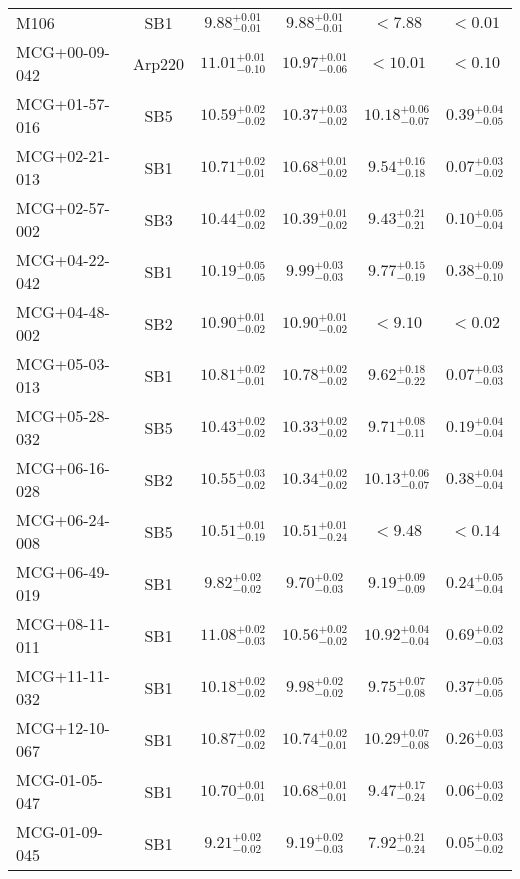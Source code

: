 \documentclass[onecolumn]{mn2e}
\begin{document}
{\begin{center}
\begin{longtable}{lccccc}
M106 & SB1 & $9.88_{-0.01}^{+0.01}$ & $9.88_{-0.01}^{+0.01}$ & $<7.88$ &$<0.01$ \\
MCG+00-09-042 & Arp220 & $11.01_{-0.10}^{+0.01}$ & $10.97_{-0.06}^{+0.01}$ & $<10.01$ &$<0.10$ \\
MCG+01-57-016 & SB5 & $10.59_{-0.02}^{+0.02}$ & $10.37_{-0.02}^{+0.03}$ & $10.18_{-0.07}^{+0.06}$ &$0.39_{-0.05}^{+0.04}$ \\
MCG+02-21-013 & SB1 & $10.71_{-0.01}^{+0.02}$ & $10.68_{-0.02}^{+0.01}$ & $9.54_{-0.18}^{+0.16}$ &$0.07_{-0.02}^{+0.03}$ \\
MCG+02-57-002 & SB3 & $10.44_{-0.02}^{+0.02}$ & $10.39_{-0.02}^{+0.01}$ & $9.43_{-0.21}^{+0.21}$ &$0.10_{-0.04}^{+0.05}$ \\
MCG+04-22-042 & SB1 & $10.19_{-0.05}^{+0.05}$ & $9.99_{-0.03}^{+0.03}$ & $9.77_{-0.19}^{+0.15}$ &$0.38_{-0.10}^{+0.09}$ \\
MCG+04-48-002 & SB2 & $10.90_{-0.02}^{+0.01}$ & $10.90_{-0.02}^{+0.01}$ & $<9.10$ &$<0.02$ \\
MCG+05-03-013 & SB1 & $10.81_{-0.01}^{+0.02}$ & $10.78_{-0.02}^{+0.02}$ & $9.62_{-0.22}^{+0.18}$ &$0.07_{-0.03}^{+0.03}$ \\
MCG+05-28-032 & SB5 & $10.43_{-0.02}^{+0.02}$ & $10.33_{-0.02}^{+0.02}$ & $9.71_{-0.11}^{+0.08}$ &$0.19_{-0.04}^{+0.04}$ \\
MCG+06-16-028 & SB2 & $10.55_{-0.02}^{+0.03}$ & $10.34_{-0.02}^{+0.02}$ & $10.13_{-0.07}^{+0.06}$ &$0.38_{-0.04}^{+0.04}$ \\
MCG+06-24-008 & SB5 & $10.51_{-0.19}^{+0.01}$ & $10.51_{-0.24}^{+0.01}$ & $<9.48$ &$<0.14$ \\
MCG+06-49-019 & SB1 & $9.82_{-0.02}^{+0.02}$ & $9.70_{-0.03}^{+0.02}$ & $9.19_{-0.09}^{+0.09}$ &$0.24_{-0.04}^{+0.05}$ \\
MCG+08-11-011 & SB1 & $11.08_{-0.03}^{+0.02}$ & $10.56_{-0.02}^{+0.02}$ & $10.92_{-0.04}^{+0.04}$ &$0.69_{-0.03}^{+0.02}$ \\
MCG+11-11-032 & SB1 & $10.18_{-0.02}^{+0.02}$ & $9.98_{-0.02}^{+0.02}$ & $9.75_{-0.08}^{+0.07}$ &$0.37_{-0.05}^{+0.05}$ \\
MCG+12-10-067 & SB1 & $10.87_{-0.02}^{+0.02}$ & $10.74_{-0.01}^{+0.02}$ & $10.29_{-0.08}^{+0.07}$ &$0.26_{-0.03}^{+0.03}$ \\
MCG-01-05-047 & SB1 & $10.70_{-0.01}^{+0.01}$ & $10.68_{-0.01}^{+0.01}$ & $9.47_{-0.24}^{+0.17}$ &$0.06_{-0.02}^{+0.03}$ \\
MCG-01-09-045 & SB1 & $9.21_{-0.02}^{+0.02}$ & $9.19_{-0.03}^{+0.02}$ & $7.92_{-0.24}^{+0.21}$ &$0.05_{-0.02}^{+0.03}$ \\

\end{longtable}
\end{center}}
\end{document}
